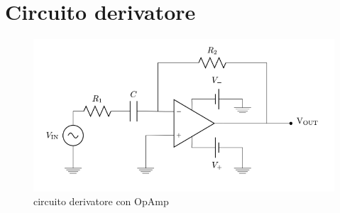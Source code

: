 \documentclass[10pt,a4paper]{article}
\begin{document}
\section{Circuito derivatore}
\begin{figure}[!htb]
  \centering
  \includegraphics[scale=0.5]{derivatore.png}
\caption{circuito derivatore con OpAmp}
\end{figure}
\end{document}
